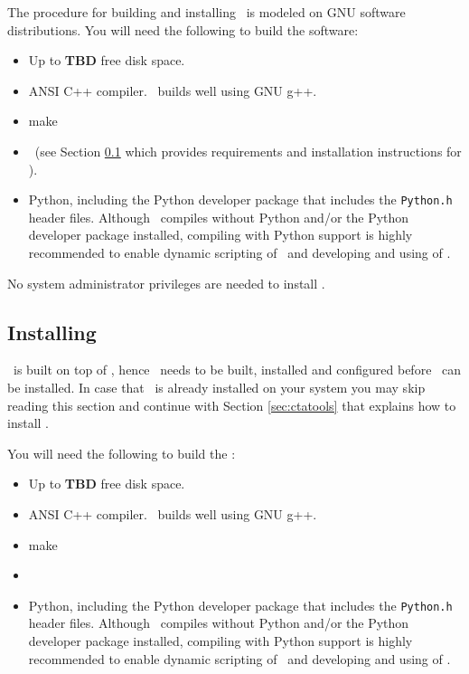 \documentclass{article}[12pt,a4]
\begin{document}
The procedure for building and installing \this\ is modeled on GNU software distributions.
You will need the following to build the software:
\begin{itemize}
\item Up to {\bf TBD} free disk space.
\item ANSI C++ compiler. \this\ builds well using GNU g++.
\item make
\item \gammalib\ (see Section \ref{sec:gammalib} which provides requirements and installation 
instructions for \gammalib).
\item Python, including the Python developer package that includes the {\tt Python.h} header
files. Although \this\ compiles without Python and/or the Python developer package installed,
compiling with Python support is highly recommended to enable dynamic scripting of \ctools\
and developing and using of \cscripts. 
\end{itemize}
No system administrator privileges are needed to install \this.


\subsection{Installing \gammalib}
\label{sec:gammalib}

\this\ is built on top of \gammalib, hence \gammalib\ needs to be built, installed and configured
before \this\ can be installed.
In case that \this\ is already installed on your system you may skip reading this section
and continue with Section \ref{sec:ctatools} that explains how to install \this.

You will need the following to build the \gammalib:
\begin{itemize}
\item Up to {\bf TBD} free disk space.
\item ANSI C++ compiler. \this\ builds well using GNU g++.
\item make
\item \cfitsio
\item Python, including the Python developer package that includes the {\tt Python.h} header
files. Although \this\ compiles without Python and/or the Python developer package installed,
compiling with Python support is highly recommended to enable dynamic scripting of \ctools\
and developing and using of \cscripts. 
\end{itemize}
\end{document}
